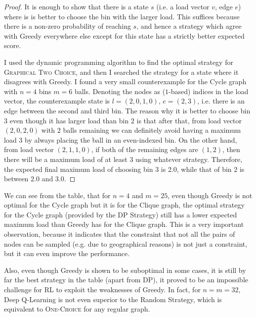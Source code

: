 \begin{proof}
It is enough to show that there is a state $s$ (i.e. a load vector $v$, edge $e$) where is is better to choose the bin with the larger load. This suffices because there is a non-zero probability of reaching $s$, and hence a strategy which agree with Greedy everywhere else except for this state has a strictly better expected score.


I used the dynamic programming algorithm to find the optimal strategy for \textsc{Graphical Two Choice}, and then I searched the strategy for a state where it disagrees with Greedy. I found a very small counterexample for the Cycle graph with $n=4$ bins $m=6$ balls. Denoting the nodes as ($1$-based) indices in the load vector, the counterexample state is $l=(2,0,1,0)$, $e=(2,3)$, i.e. there is an edge between the second and third bin. The reason why it is better to choose bin $3$ even though it has larger load than bin $2$ is that after that, from load vector $(2,0,2,0)$ with $2$ balls remaining we can definitely avoid having a maximum load $3$ by always placing the ball in an even-indexed bin. On the other hand, from load vector $(2,1,1,0)$, if both of the remaining edges are $(1,2)$, then there will be a maximum load of at least $3$ using whatever strategy. Therefore, the expected final maximum load of choosing bin $3$ is $2.0$, while that of bin $2$ is between $2.0$ and $3.0$.
\end{proof}


We can see from the table, that for $n=4$ and $m=25$, even though Greedy is not optimal for the Cycle graph but it is for the Clique graph, the optimal strategy for the Cycle graph (provided by the DP Strategy) still has a lower expected maximum load than Greedy has for the Clique graph. This is a very important observation, because it indicates that the constraint that not all the pairs of nodes can be sampled (e.g. due to geographical reasons) is not just a constraint, but it can even improve the performance.


Also, even though Greedy is shown to be suboptimal in some cases, it is still by far the best strategy in the table (apart from DP), it proved to be an impossible challenge for RL to exploit the weaknesses of Greedy. In fact, for $n=m=32$, Deep Q-Learning is not even superior to the Random Strategy, which is equivalent to \textsc{One-Choice} for any regular graph.




